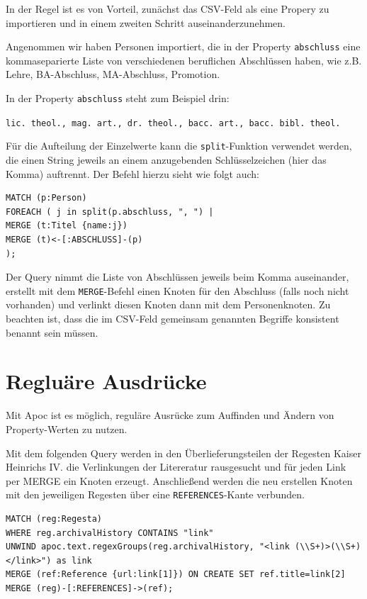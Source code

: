 \documentclass[ngerman,]{scrreprt}
\begin{document}
In der Regel ist es von Vorteil, zunächst das CSV-Feld als eine Propery zu importieren und in einem zweiten Schritt auseinanderzunehmen.

Angenommen wir haben Personen importiert, die in der Property \texttt{abschluss} eine kommaseparierte Liste von verschiedenen beruflichen Abschlüssen haben, wie z.B. Lehre, BA-Abschluss, MA-Abschluss, Promotion.

In der Property \texttt{abschluss} steht zum Beispiel drin:

\texttt{lic.\ theol.,\ mag.\ art.,\ dr.\ theol.,\ bacc.\ art.,\ bacc.\ bibl.\ theol.}

Für die Aufteilung der Einzelwerte kann die \texttt{split}-Funktion verwendet werden, die einen String jeweils an einem anzugebenden Schlüsselzeichen (hier das Komma) auftrennt. Der Befehl hierzu sieht wie folgt auch:

\begin{verbatim}
MATCH (p:Person)
FOREACH ( j in split(p.abschluss, ", ") |
MERGE (t:Titel {name:j})
MERGE (t)<-[:ABSCHLUSS]-(p)
);
\end{verbatim}

Der Query nimmt die Liste von Abschlüssen jeweils beim Komma auseinander, erstellt mit dem \texttt{MERGE}-Befehl einen Knoten für den Abschluss (falls noch nicht vorhanden) und verlinkt diesen Knoten dann mit dem Personenknoten. Zu beachten ist, dass die im CSV-Feld gemeinsam genannten Begriffe konsistent benannt sein müssen.

\section{Regluäre Ausdrücke}\label{regluuxe4re-ausdruxfccke}

Mit Apoc ist es möglich, reguläre Ausrücke zum Auffinden und Ändern von Property-Werten zu nutzen.

Mit dem folgenden Query werden in den Überlieferungsteilen der Regesten Kaiser Heinrichs IV. die Verlinkungen der Litereratur rausgesucht und für jeden Link per MERGE ein Knoten erzeugt. Anschließend werden die neu erstellen Knoten mit den jeweiligen Regesten über eine \texttt{REFERENCES}-Kante verbunden.

\begin{verbatim}
MATCH (reg:Regesta)
WHERE reg.archivalHistory CONTAINS "link"
UNWIND apoc.text.regexGroups(reg.archivalHistory, "<link (\\S+)>(\\S+)</link>") as link
MERGE (ref:Reference {url:link[1]}) ON CREATE SET ref.title=link[2]
MERGE (reg)-[:REFERENCES]->(ref);
\end{verbatim}
\end{document}
